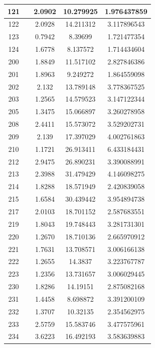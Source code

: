 \begin{table}[!tp]
\begin{tabular}{|c|c|c|c|c|}
		121 & & 2.0902 & 10.279925 & 1.976437859\\ \hline
		122 & & 2.0928 & 14.211312 & 3.117896543\\ \hline
		123 & & 0.7942 &  8.39699  & 1.721477354\\ \hline
		124 & & 1.6778 &  8.137572 & 1.714434604\\ \hline
		200 & & 1.8849 & 11.517102 & 2.827846386\\ \hline
		201 & & 1.8963 &  9.249272 & 1.864559098\\ \hline
		202 & & 2.132  & 13.789148 & 3.778367525\\ \hline
		203 & & 1.2565 & 14.579523 & 3.147122344\\ \hline
		205 & & 1.3475 & 15.066897 & 3.260278958\\ \hline
		208 & & 2.4411 & 15.573072 & 3.529202731\\ \hline
		209 & & 2.139  & 17.397029 & 4.002761863\\ \hline	
		210 & & 1.1721 & 26.913411 & 6.433184431\\ \hline
		212 & & 2.9475 & 26.890231 & 3.390088991\\ \hline
		213 & & 2.3988 & 31.479429 & 4.146098275\\ \hline
		214 & & 1.8288 & 18.571949 & 2.420839058\\ \hline
		215 & & 1.6584 & 30.439442 & 3.954894738\\ \hline
		217 & & 2.0103 & 18.701152 & 2.587683551\\ \hline
		219 & & 1.8043 & 19.748443 & 3.281731301\\ \hline
		220 & & 1.2670 & 18.710136 & 2.665970912\\ \hline		
		221 & & 1.7631 & 13.708571 & 3.006166138\\ \hline
		222 & & 1.2655 & 14.3837   & 3.223767787\\ \hline
		223 & & 1.2356 & 13.731657 & 3.006029445\\ \hline
		230 & & 1.8286 & 14.19151  & 2.875082168\\ \hline
		231 & & 1.4458 &  8.698872 & 3.391200109\\ \hline
		232 & & 1.3707 & 10.32135  & 2.354562975\\ \hline
		233 & & 2.5759 & 15.583746 & 3.477575961\\ \hline
		234 & & 3.6223 & 16.492193 & 3.583639883\\ \hline
	\end{tabular}
\end{table}

